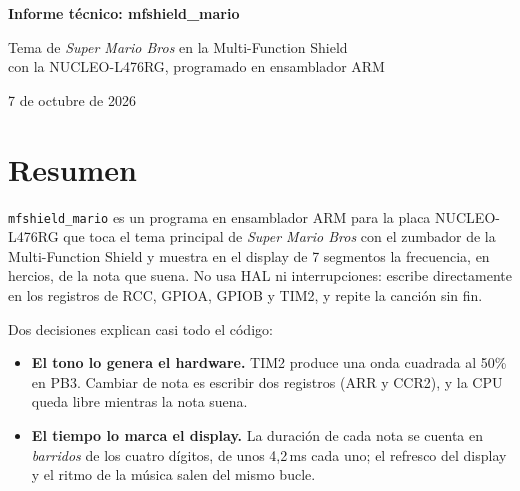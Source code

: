 \documentclass[11pt,letterpaper]{article}
\newcommand*{\autor}{}
\begin{document}
\begin{center}
  {\sffamily\bfseries\LARGE\color{azul} Informe técnico: mfshield\_mario\par}
  \vspace{5pt}
  {\sffamily\large Tema de \emph{Super Mario Bros} en la Multi-Function Shield\\
   con la NUCLEO-L476RG, programado en ensamblador ARM\par}
  \vspace{7pt}
  \ifx\autor\empty\else{\autor\par}\vspace{2pt}\fi
  {\small\color{gris}7 de octubre de 2026\par}
\end{center}
\vspace{4pt}

\section{Resumen}

\texttt{mfshield\_mario} es un programa en ensamblador ARM para la placa NUCLEO-L476RG que toca el tema
principal de \emph{Super Mario Bros} con el zumbador de la Multi-Function Shield y muestra en el display
de 7 segmentos la frecuencia, en hercios, de la nota que suena. No usa HAL ni interrupciones: escribe
directamente en los registros de RCC, GPIOA, GPIOB y TIM2, y repite la canción sin fin.

Dos decisiones explican casi todo el código:
\begin{itemize}
  \item \textbf{El tono lo genera el hardware.} TIM2 produce una onda cuadrada al 50\% en PB3. Cambiar de
        nota es escribir dos registros (ARR y CCR2), y la CPU queda libre mientras la nota suena.
  \item \textbf{El tiempo lo marca el display.} La duración de cada nota se cuenta en \emph{barridos} de los
        cuatro dígitos, de unos 4,2\,ms cada uno; el refresco del display y el ritmo de la música salen
        del mismo bucle.
\end{itemize}
\end{document}
